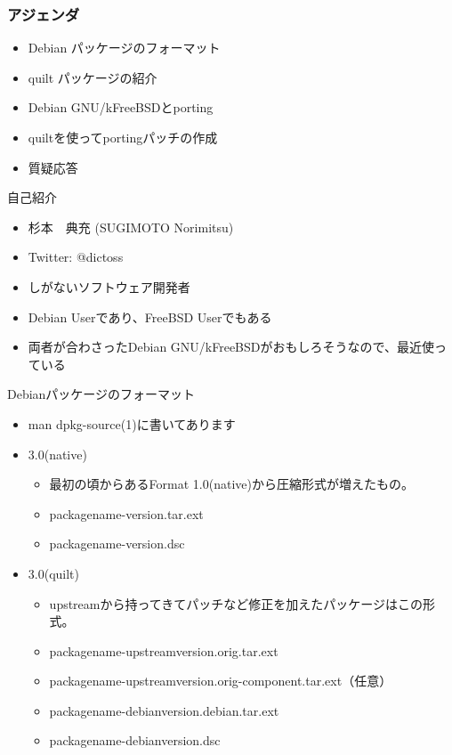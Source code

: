 \frame{\titlepage{}}


\begin{frame}
 \frametitle{アジェンダ}
 \begin{itemize}
  \item Debian パッケージのフォーマット
  \item quilt パッケージの紹介
  \item Debian GNU/kFreeBSDとporting
  \item quiltを使ってportingパッチの作成
  \item 質疑応答
 \end{itemize}
\end{frame}

\begin{frame}{自己紹介}
 \begin{itemize}
  \item 杉本　典充 (SUGIMOTO Norimitsu)
  \item Twitter: @dictoss
  \item しがないソフトウェア開発者
  \item Debian Userであり、FreeBSD Userでもある
  \item 両者が合わさったDebian GNU/kFreeBSDがおもしろそうなので、最近使っている
 \end{itemize}
\end{frame}


\begin{frame}{Debianパッケージのフォーマット}
 \begin{itemize}
  \item man dpkg-source(1)に書いてあります
  \item 3.0(native)
   \begin{itemize}
    \item 最初の頃からあるFormat 1.0(native)から圧縮形式が増えたもの。
    \item packagename-version.tar.ext
    \item packagename-version.dsc
   \end{itemize}
  \item 3.0(quilt)
   \begin{itemize}
    \item upstreamから持ってきてパッチなど修正を加えたパッケージはこの形式。
    \item packagename-upstreamversion.orig.tar.ext
    \item packagename-upstreamversion.orig-component.tar.ext（任意）
    \item packagename-debianversion.debian.tar.ext
    \item packagename-debianversion.dsc
   \end{itemize}
 \end{itemize}
\end{frame}

